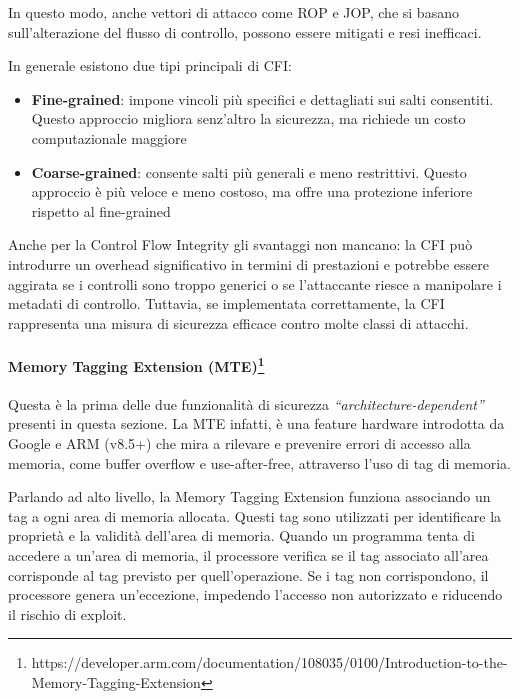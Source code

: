 In questo modo, anche vettori di attacco come ROP e JOP, che si basano sull'alterazione
del flusso di controllo, possono essere mitigati e resi inefficaci.

In generale esistono due tipi principali di CFI:
\begin{itemize}
  \item \textbf{Fine-grained}: impone vincoli più specifici e dettagliati sui salti
    consentiti. Questo approccio migliora senz'altro la sicurezza, ma richiede un
    costo computazionale maggiore

  \item \textbf{Coarse-grained}: consente salti più generali e meno restrittivi.
    Questo approccio è più veloce e meno costoso, ma offre una protezione inferiore
    rispetto al fine-grained
\end{itemize}

Anche per la Control Flow Integrity gli svantaggi non mancano: la CFI può
introdurre un overhead significativo in termini di prestazioni e potrebbe essere
aggirata se i controlli sono troppo generici o se l'attaccante riesce a
manipolare i metadati di controllo. Tuttavia, se implementata correttamente, la CFI
rappresenta una misura di sicurezza efficace contro molte classi di attacchi.~\cite{control_flow_integrity}

\paragraph{Memory Tagging Extension (MTE)\protect\footnote{https://developer.arm.com/documentation/108035/0100/Introduction-to-the-Memory-Tagging-Extension}}
Questa è la prima delle due funzionalità di sicurezza \textit{``architecture-dependent''}
presenti in questa sezione. La MTE infatti, è una feature hardware introdotta da
Google e ARM (v8.5+) che mira a rilevare e prevenire errori di accesso alla memoria,
come buffer overflow e use-after-free, attraverso l'uso di tag di memoria.

Parlando ad alto livello, la Memory Tagging Extension funziona associando un tag
a ogni area di memoria allocata. Questi tag sono utilizzati per identificare la proprietà
e la validità dell'area di memoria. Quando un programma tenta di accedere a un'area
di memoria, il processore verifica se il tag associato all'area corrisponde al tag
previsto per quell'operazione. Se i tag non corrispondono, il processore genera un'eccezione,
impedendo l'accesso non autorizzato e riducendo il rischio di exploit.

